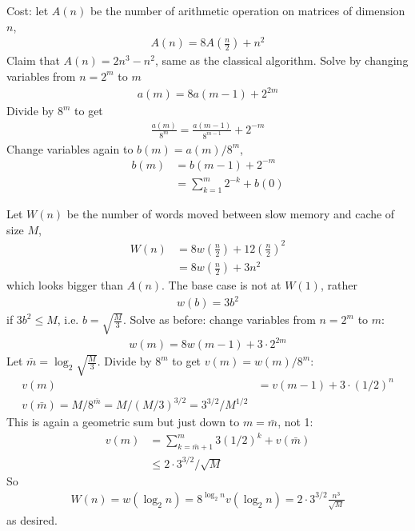 \documentclass[11pt]{article}
\numberwithin{equation}{section}
\begin{document}
Cost: let $A(n)$ be the number of arithmetic operation on matrices of dimension $n$, \begin{align*}
    A(n) = 8A(\frac{n}{2}) + n^2
\end{align*}
Claim that $A(n) = 2n^3 - n^2$, same as the classical algorithm. Solve by changing variables from $n=2^m$ to $m$ \begin{align*}
    a(m) = 8a(m-1) + 2^{2m}
\end{align*}
Divide by $8^m$ to get \begin{align*}
    \frac{a(m)}{8^{m}}=\frac{a(m-1)}{8^{m-1}}+2^{-m}
\end{align*}
Change variables again to $b(m) = a(m)/8^m$,\begin{align*}
    b(m) &= b(m-1)+2^{-m} \\
    &= \sum_{k=1}^{m} 2^{-k}+b(0)
\end{align*}

Let $W(n)$ be the number of words moved between slow memory and cache of size $M$,\begin{align*}
    W(n) &= 8  w\left(\frac{n}{2}\right) + 12\left(\frac{n}{2}\right)^{2} \\
    &= 8  w\left(\frac{n}{2}\right) + 3n^2
\end{align*}
which looks bigger than $A(n)$. The base case is not at $W(1)$, rather \begin{align*}
    w(b)=3 b^{2}
\end{align*}
if $3b^{2} \leq M$, i.e. $b=\sqrt{\frac{M}{3}}$. Solve as before: change variables from $n=2^m$ to $m$: \begin{align*}
    w(m)=8 w(m-1)+3 \cdot 2^{2 m}
\end{align*}
Let $\bar{m} = \log_2 \sqrt{\frac{M}{3}}$. Divide by $8^m$ to get $v(m) = w(m)/8^m$: \begin{align*}
    v(m) &=v(m-1)+3 \cdot(1 / 2)^{n} \\
    v(\bar{m})=M / 8^{\bar{m}}=M /(M / 3)^{3 / 2}=3^{3 / 2} / M^{1 / 2}
\end{align*}
This is again a geometric sum but just down to $m = \bar{m}$, not 1: \begin{align*}
    v(m) &= \sum_{k=\bar{m}+1}^{m} 3(1 / 2)^{k}+v(\bar{m}) \\
    &\leq 2 \cdot 3^{3 / 2} / \sqrt{M}
\end{align*}
So \begin{align*}
    W(n) = w(\log_2 n) = 8^{\log_2 n} v(\log_2 n) = 2 \cdot 3^{3/2} \frac{n^3}{\sqrt{M}}
\end{align*}
as desired.
\end{document}
